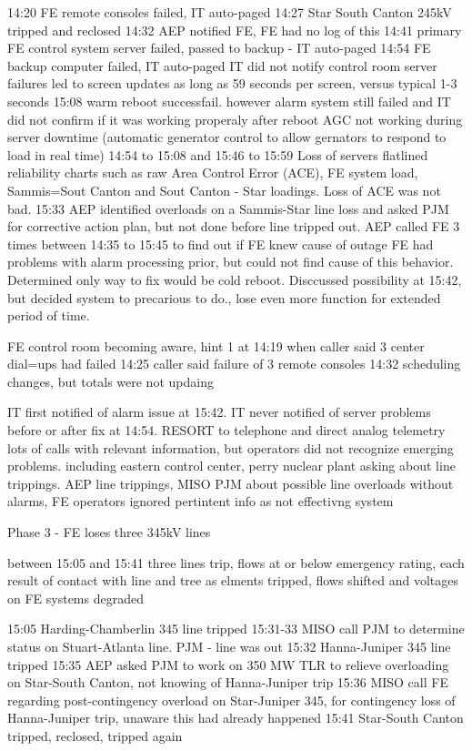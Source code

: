 14:20 FE remote consoles failed, IT auto-paged
14:27 Star South Canton 245kV tripped and reclosed
14:32 AEP notified FE, FE had no log of this
14:41 primary FE control system server failed, passed to backup - IT auto-paged
14:54 FE backup computer failed, IT auto-paged
IT did not notify control room
server failures led to screen updates as long as 59 seconds per screen, versus typical 1-3 seconds
15:08 warm reboot successfail.  however alarm system still failed and IT did not confirm if it was working properaly after reboot
AGC not working during server downtime (automatic generator control to allow gernators to respond to load in real time)
14:54 to 15:08 and 15:46 to 15:59
Loss of servers flatlined reliability charts such as raw Area Control Error (ACE), FE system load, Sammis=Sout Canton and Sout Canton - Star loadings.  Loss of ACE was not bad.
15:33 AEP identified overloads on a Sammis-Star line loss and asked PJM for corrective action plan, but not done before line tripped out.  AEP called FE 3 times between 14:35 to 15:45 to find out if FE knew cause of outage
FE had problems with alarm processing prior, but could not find cause of this behavior.  Determined only way to fix would be cold reboot.  Disccussed possibility at 15:42, but decided system to precarious to do., lose even more function for extended period of time.

FE control room becoming aware,
hint 1 at 14:19 when caller said 3 center dial=ups had failed
14:25 caller said failure of 3 remote consoles
14:32 scheduling changes, but totals were not updaing

IT first notified of alarm issue at 15:42.  IT never notified of server problems before or after fix at 14:54.
RESORT to telephone and direct analog telemetry
lots of calls with relevant information, but operators did not recognize emerging problems.  including eastern control center, perry nuclear plant asking about line trippings.  AEP line trippings, MISO PJM about possible line overloads
without alarms, FE operators ignored pertintent info as not effectivng system


Phase 3 - FE loses three 345kV lines

between 15:05 and 15:41 three lines trip, flows at or below emergency rating, each result of contact with line and tree
as elments tripped, flows shifted and voltages on FE systems degraded

15:05 Harding-Chamberlin 345 line tripped
15:31-33 MISO call PJM to determine status on Stuart-Atlanta line. PJM - line was out
15:32 Hanna-Juniper 345 line tripped 
15:35 AEP asked PJM to work on 350 MW TLR to relieve overloading on Star-South Canton, not knowing of Hanna-Juniper trip
15:36 MISO call FE regarding post-contingency overload on Star-Juniper 345, for contingency loss of Hanna-Juniper trip, unaware this had already happened
15:41 Star-South Canton tripped, reclosed, tripped again

